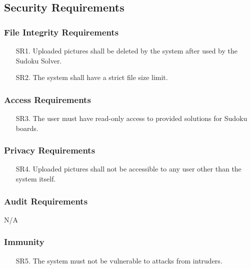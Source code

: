 \documentclass[11pt]{article}
\begin{document}
\subsection{Security Requirements}

\subsubsection{File Integrity Requirements}

\begin{enumerate}
    \item [SR1.] Uploaded pictures shall be deleted by the system after used by the Sudoku Solver.
    
    \item [SR2.] The system shall have a strict file size limit.
\end{enumerate}

\subsubsection{Access Requirements}

\begin{enumerate}
    \item [SR3.] The user must have read-only access to provided solutions for Sudoku boards.
\end{enumerate}

\subsubsection{Privacy Requirements}

\begin{enumerate}
    \item [SR4.] Uploaded pictures shall not be accessible to any user other than the system itself.
\end{enumerate}

\subsubsection{Audit Requirements}

N/A

\subsubsection{Immunity}

\begin{enumerate}
    \item [SR5.] The system must not be vulnerable to attacks from intruders.
\end{enumerate}
\end{document}
